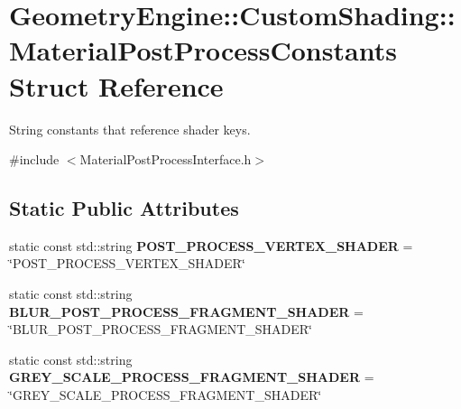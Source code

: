 \hypertarget{struct_geometry_engine_1_1_custom_shading_1_1_material_post_process_constants}{}\section{Geometry\+Engine\+::Custom\+Shading\+::Material\+Post\+Process\+Constants Struct Reference}
\label{struct_geometry_engine_1_1_custom_shading_1_1_material_post_process_constants}


String constants that reference shader keys.  




{\ttfamily \#include $<$Material\+Post\+Process\+Interface.\+h$>$}

\subsection*{Static Public Attributes}
\begin{DoxyCompactItemize}
\item 
\mbox{\label{struct_geometry_engine_1_1_custom_shading_1_1_material_post_process_constants_a40cd2866398a0be0cebcf25f569471fc}} 
static const std\+::string {\bfseries P\+O\+S\+T\+\_\+\+P\+R\+O\+C\+E\+S\+S\+\_\+\+V\+E\+R\+T\+E\+X\+\_\+\+S\+H\+A\+D\+ER} = \char`\"{}P\+O\+S\+T\+\_\+\+P\+R\+O\+C\+E\+S\+S\+\_\+\+V\+E\+R\+T\+E\+X\+\_\+\+S\+H\+A\+D\+ER\char`\"{}
\item 
\mbox{\label{struct_geometry_engine_1_1_custom_shading_1_1_material_post_process_constants_a5ecdc27909287da9df7a7a00cf212900}} 
static const std\+::string {\bfseries B\+L\+U\+R\+\_\+\+P\+O\+S\+T\+\_\+\+P\+R\+O\+C\+E\+S\+S\+\_\+\+F\+R\+A\+G\+M\+E\+N\+T\+\_\+\+S\+H\+A\+D\+ER} = \char`\"{}B\+L\+U\+R\+\_\+\+P\+O\+S\+T\+\_\+\+P\+R\+O\+C\+E\+S\+S\+\_\+\+F\+R\+A\+G\+M\+E\+N\+T\+\_\+\+S\+H\+A\+D\+ER\char`\"{}
\item 
\mbox{\label{struct_geometry_engine_1_1_custom_shading_1_1_material_post_process_constants_a80f53a04f6d82064f94ecfed5b0bc334}} 
static const std\+::string {\bfseries G\+R\+E\+Y\+\_\+\+S\+C\+A\+L\+E\+\_\+\+P\+R\+O\+C\+E\+S\+S\+\_\+\+F\+R\+A\+G\+M\+E\+N\+T\+\_\+\+S\+H\+A\+D\+ER} = \char`\"{}G\+R\+E\+Y\+\_\+\+S\+C\+A\+L\+E\+\_\+\+P\+R\+O\+C\+E\+S\+S\+\_\+\+F\+R\+A\+G\+M\+E\+N\+T\+\_\+\+S\+H\+A\+D\+ER\char`\"{}
\end{DoxyCompactItemize}


